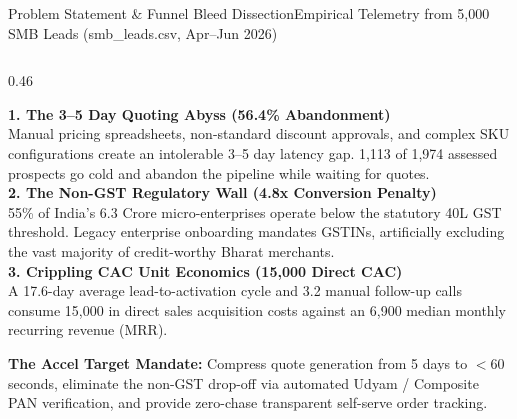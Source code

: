 \documentclass[aspectratio=169,10pt]{beamer}
\newcommand{\inr}{\text{Rs.\ }}
\begin{document}
\begin{frame}{Problem Statement \& Funnel Bleed Dissection}{Empirical Telemetry from 5,000 SMB Leads (smb\_leads.csv, Apr--Jun 2026)}
\begin{columns}[T]
    \begin{column}{0.46\textwidth}
      \begin{tcolorbox}[academicbox, title={\fontsize{6.5pt}{7.8pt}\selectfont\textbf{The Three Structural Failure Modes}}, coltitle=charcoal]
        {\fontsize{5.2pt}{6.4pt}\selectfont
        \textbf{1. The 3--5 Day Quoting Abyss (56.4\% Abandonment)} \\
        Manual pricing spreadsheets, non-standard discount approvals, and complex SKU configurations create an intolerable 3--5 day latency gap. 1,113 of 1,974 assessed prospects go cold and abandon the pipeline while waiting for quotes. \\[0.06cm]
        \textbf{2. The Non-GST Regulatory Wall (4.8x Conversion Penalty)} \\
        55\% of India's 6.3 Crore micro-enterprises operate below the statutory \inr 40L GST threshold. Legacy enterprise onboarding mandates GSTINs, artificially excluding the vast majority of credit-worthy Bharat merchants. \\[0.06cm]
        \textbf{3. Crippling CAC Unit Economics (\inr 15,000 Direct CAC)} \\
        A 17.6-day average lead-to-activation cycle and 3.2 manual follow-up calls consume \inr 15,000 in direct sales acquisition costs against an \inr 6,900 median monthly recurring revenue (MRR).
        }
      \end{tcolorbox}

      \vspace{0.04cm}
      \begin{tcolorbox}[accentbox]
        {\fontsize{5.4pt}{6.6pt}\selectfont
        \textbf{\textcolor{airtelred}{The Accel Target Mandate:}} Compress quote generation from 5 days to $<60$ seconds, eliminate the non-GST drop-off via automated Udyam / Composite PAN verification, and provide zero-chase transparent self-serve order tracking.
        }
      \end{tcolorbox}
    \end{column}
  \end{columns}
\end{frame}
\end{document}
